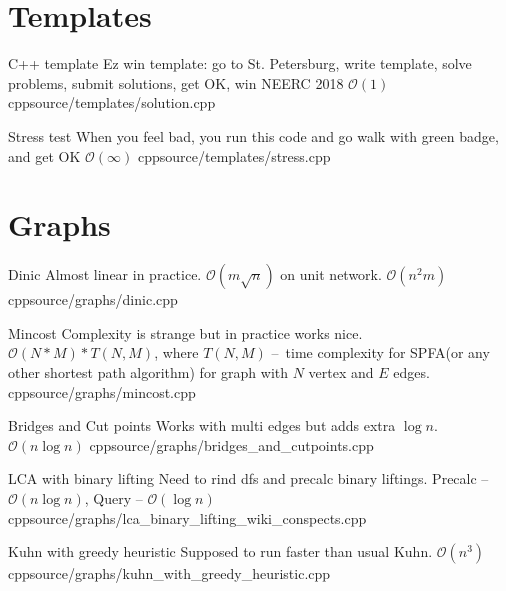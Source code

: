 \documentclass[landscape, 10pt, a4paper, oneside, twocolumn]{extarticle}
\begin{document}
\maketitlepage





\section{Templates}

\Algorithm
{C++ template}
{Ez win template: go to St. Petersburg, write template, solve problems, submit solutions, get OK, win NEERC 2018}
{$\mathcal{O}(1)$}
{cpp}{source/templates/solution.cpp}

\Algorithm
{Stress test}
{When you feel bad, you run this code and go walk with green badge, and get OK}
{$\mathcal{O}(\infty)$}
{cpp}{source/templates/stress.cpp}




\section{Graphs}

\Algorithm
{Dinic}
{Almost linear in practice. $\mathcal{O}(m \sqrt n)$ on unit network.}
{$\mathcal{O}(n^{2}m)$}
{cpp}{source/graphs/dinic.cpp}

\Algorithm
{Mincost}
{Complexity is strange but in practice works nice.}
{$\mathcal{O}(N * M) * T(N, M)$, where $T(N, M)$ – time complexity for SPFA(or any other shortest path algorithm) for graph with $N$ vertex and $E$ edges.}
{cpp}{source/graphs/mincost.cpp}

\Algorithm
{Bridges and Cut points}
{Works with multi edges but adds extra $ \log n$.}
{$\mathcal{O}(n \log n)$}
{cpp}{source/graphs/bridges_and_cutpoints.cpp}

\Algorithm
{LCA with binary lifting}
{Need to rind dfs and precalc binary liftings.}
{Precalc – $\mathcal{O}(n \log n)$, Query – $\mathcal{O}(\log n)$}
{cpp}{source/graphs/lca_binary_lifting_wiki_conspects.cpp}

\Algorithm
{Kuhn with greedy heuristic}
{Supposed to run faster than usual Kuhn.}
{$\mathcal{O}(n^{3})$}
{cpp}{source/graphs/kuhn_with_greedy_heuristic.cpp}

\end{document}
